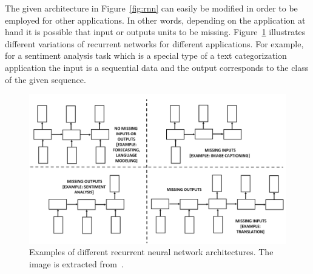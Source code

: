 The given architecture in Figure~\ref{fig:rnn} can easily be modified in order to be employed for other applications. In other words, depending on the application at hand it is possible that input or outputs units to be missing. Figure~\ref{fig:rnn_missing_input_output} illustrates different variations of recurrent networks for different applications. For example, for a sentiment analysis task which is a special type of a text categorization application the input is a sequential data and the output corresponds to the class of the given sequence. 
\begin{figure}[h]
\centering
 \includegraphics[width=\linewidth]{Figures/fig_rnn_missing_input_output.png}
 \caption{Examples of different recurrent neural network architectures. The image is extracted from~\cite{DBLP:books/sp/Aggarwal18}.}
 \label{fig:rnn_missing_input_output}
\end{figure}


